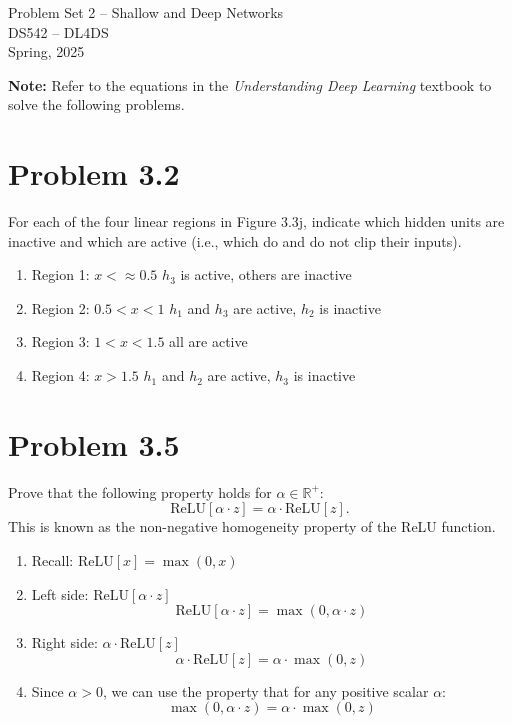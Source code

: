 \documentclass[10pt]{article}
\begin{document}
\begin{center}
    \LARGE {Problem Set 2 – Shallow and Deep Networks} \\[1em]
    \Large{DS542 – DL4DS} \\[0.5em]
    \large Spring, 2025
\end{center}

\vspace{2em}

\noindent\textbf{Note:} Refer to the equations in the \textit{Understanding Deep Learning} textbook to solve the following problems.

\vspace{2em}

\section*{Problem 3.2}
For each of the four linear regions in Figure 3.3j, indicate which hidden units are inactive and which are active (i.e., which do and do not clip their inputs).

\begin{enumerate}
    \item Region 1: $x < \approx 0.5$ \textemdash{} $h_3$ is active, others are inactive
    \item Region 2: $0.5 < x < 1$ \textemdash{} $h_1$ and $h_3$ are active, $h_2$ is inactive
    \item Region 3: $1 < x < 1.5$ \textemdash{} all are active
    \item Region 4: $x > 1.5$ \textemdash{} $h_1$ and $h_2$ are active, $h_3$ is inactive
\end{enumerate}


\vspace{2em}

\section*{Problem 3.5}

Prove that the following property holds for $\alpha \in \mathbb{R}^+$:
\[
\text{ReLU}[\alpha \cdot z] = \alpha \cdot \text{ReLU}[z].
\]
This is known as the non-negative homogeneity property of the ReLU function.

\vspace{1em}

\begin{enumerate}
    \item Recall: $\text{ReLU}[x] = \max(0,x)$

    \item Left side: $\text{ReLU}[\alpha \cdot z]$
        \[ \text{ReLU}[\alpha \cdot z] = \max(0, \alpha \cdot z) \]

    \item Right side: $\alpha \cdot \text{ReLU}[z]$
        \[ \alpha \cdot \text{ReLU}[z] = \alpha \cdot \max(0, z) \]

    \item Since $\alpha > 0$, we can use the property that for any positive scalar $\alpha$:
        \[ \max(0, \alpha \cdot z) = \alpha \cdot \max(0, z) \]
\end{enumerate}
\end{document}
